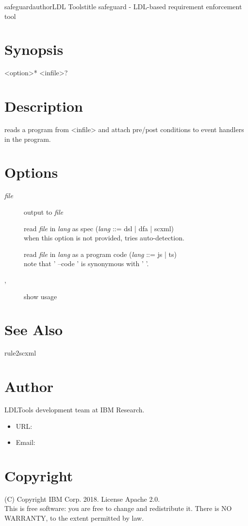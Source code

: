 \documentclass[fancy]{article}
\begin{document}
\begin{Name}{1}{safeguard}{author}{LDL Tools}{title}
safeguard - LDL-based requirement enforcement tool
\end{Name}

\section{Synopsis}
 <option>* <infile>?

\section{Description}
 reads a program from <infile>
and attach pre/post conditions to event handlers in the program.

\section{Options}

\begin{description}
\item[ \emph{file}]
  output to \emph{file}
\item[ ]
  read \emph{file} in \emph{lang} as spec (\emph{lang} ::= dsl | dfa | scxml)\\
  when this option is not provided,  tries auto-detection.
\item[ ]
  read \emph{file} in \emph{lang} as a program code (\emph{lang} ::= js | ts)\\
  note that ' --code ' is synonymous with ' '.
%
\item[, ]
  show usage

\end{description}

\section{See Also}
rule2scxml

\section{Author}
LDLTools development team at IBM Research.

\begin{itemize}
\item URL: 
\item Email: 
\end{itemize}

\section{Copyright}
(C) Copyright IBM Corp. 2018.
License Apache 2.0.\\

This is free software: you are free to change and redistribute it.
There is NO  WARRANTY,  to the extent permitted by law.
\end{document}
